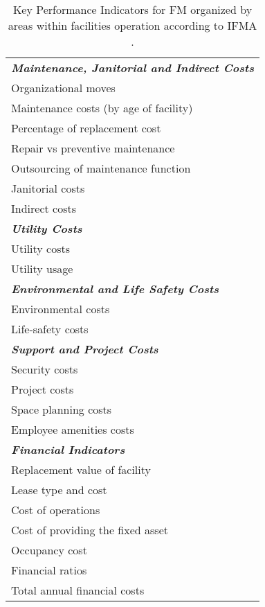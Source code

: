 \begin{table}[h!]
\begin{adjustwidth}{3cm}{0cm}
{\begin{tabular}{l}
		{\bf {\emph{Maintenance, Janitorial and Indirect Costs}}} \\
		Organizational moves \\
		 Maintenance costs (by age of facility) \\ 
		 Percentage of replacement cost \\
		Repair vs preventive maintenance \\ 
		 Outsourcing of maintenance function \\
		 Janitorial costs \\ 
		 Indirect costs \\ 
		\hline

		{\bf {\emph{Utility Costs}}}\\
		Utility costs \\
		Utility usage \\ 
		\hline

		{\bf {\emph{Environmental and Life Safety Costs}}}\\
		Environmental costs \\
		Life-safety costs \\ 
		\hline

		{\bf {\emph{Support and Project Costs}}}\\
		Security costs \\
		Project costs \\
		Space planning costs \\ 
		Employee amenities costs \\ 
		\hline

		{\bf {\emph{Financial Indicators}}}\\
		Replacement value of facility \\
		Lease type and cost \\
		Cost of operations \\ 
		Cost of providing the fixed asset \\ 
		Occupancy cost \\ 
		Financial ratios \\ 
		Total annual financial costs \\ 
		\hline
	\end{tabular}
	}
	\end{adjustwidth}
\caption{Key Performance Indicators for FM organized by areas within facilities operation according to IFMA \cite{Roka-Madarasz2010}.}
\label{tb:TableKPIFMBenchmarking}
\end{table}

